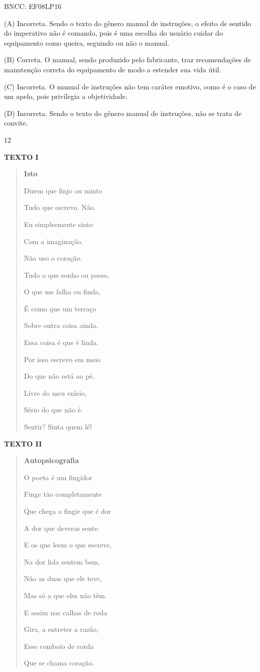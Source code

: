 BNCC: EF08LP16

(A) Incorreta. Sendo o texto do gênero manual de instruções, o efeito de
sentido do imperativo não é comando, pois é uma escolha do usuário
cuidar do equipamento como queira, seguindo ou não o manual.

(B) Correta. O manual, sendo produzido pelo fabricante, traz
recomendações de manutenção correta do equipamento de modo a estender
sua vida útil.

(C) Incorreta. O manual de instruções não tem caráter emotivo, como é o
caso de um apelo, pois privilegia a objetividade.

(D) Incorreta. Sendo o texto do gênero manual de instruções, não se
trata de convite.

\num{12}

\textbf{TEXTO I}

\begin{quote}

\textbf{Isto}

Dizem que finjo ou minto

Tudo que escrevo. Não.

Eu simplesmente sinto

Com a imaginação.

Não uso o coração.

Tudo o que sonho ou passo,

O que me falha ou finda,

É como que um terraço

Sobre outra coisa ainda.

Essa coisa é que é linda.

Por isso escrevo em meio

Do que não está ao pé,

Livre do meu enleio,

Sério do que não é.

Sentir? Sinta quem lê!
\end{quote}


\textbf{TEXTO II}

\begin{quote}
\textbf{Autopsicografia}

O poeta é um fingidor

Finge tão completamente

Que chega a fingir que é dor

A dor que deveras sente.

E os que leem o que escreve,

Na dor lida sentem bem,

Não as duas que ele teve,

Mas só a que eles não têm.

E assim nas calhas de roda

Gira, a entreter a razão,

Esse comboio de corda

Que se chama coração.
\end{quote}

